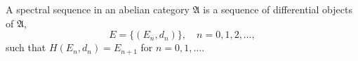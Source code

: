 A spectral sequence in an abelian category $\mathfrak{A}$ is a sequence of differential objects of $\mathfrak{A}$,
$$E = \{(E_n, d_n)\}, \quad n = 0, 1, 2, \ldots,$$
such that $H(E_n, d_n) = E_{n+1}$ for $n = 0, 1, \ldots$.
